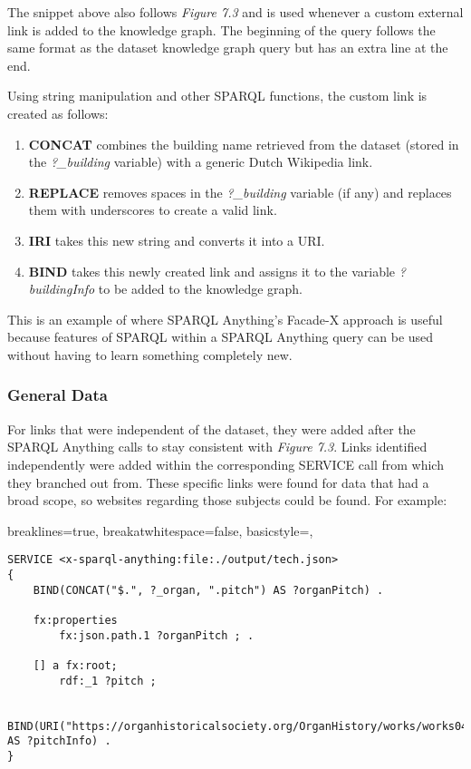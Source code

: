 The snippet above also follows \textit{Figure 7.3} and is used whenever a custom external link is added to the knowledge graph. The beginning of the query follows the same format as the dataset knowledge graph query but has an extra line at the end.

Using string manipulation and other SPARQL functions, the custom link is created as follows:
\begin{enumerate}
    \item \textbf{CONCAT} combines the building name retrieved from the dataset (stored in the \textit{?\_building} variable) with a generic Dutch Wikipedia link.
    \item \textbf{REPLACE} removes spaces in the \textit{?\_building} variable (if any) and replaces them with underscores to create a valid link. 
    \item \textbf{IRI} takes this new string and converts it into a URI.
    \item \textbf{BIND} takes this newly created link and assigns it to the variable \textit{?buildingInfo} to be added to the knowledge graph. 
\end{enumerate}

This is an example of where SPARQL Anything's Facade-X approach is useful because features of SPARQL within a SPARQL Anything query can be used without having to learn something completely new. 

\subsubsection{General Data}
\hspace*{0.5cm} For links that were independent of the dataset, they were added after the SPARQL Anything calls to stay consistent with \textit{Figure 7.3}. Links identified independently were added within the corresponding SERVICE call from which they branched out from. These specific links were found for data that had a broad scope, so websites regarding those subjects could be found. For example:

\lstset
{
    breaklines=true,
    breakatwhitespace=false,
    basicstyle=\ttfamily,
}
\begin{lstlisting}
SERVICE <x-sparql-anything:file:./output/tech.json>
{
    BIND(CONCAT("$.", ?_organ, ".pitch") AS ?organPitch) .

    fx:properties
        fx:json.path.1 ?organPitch ; .

    [] a fx:root; 
        rdf:_1 ?pitch ;
    
    BIND(URI("https://organhistoricalsociety.org/OrganHistory/works/works04.htm") AS ?pitchInfo) .
} 
\end{lstlisting}

